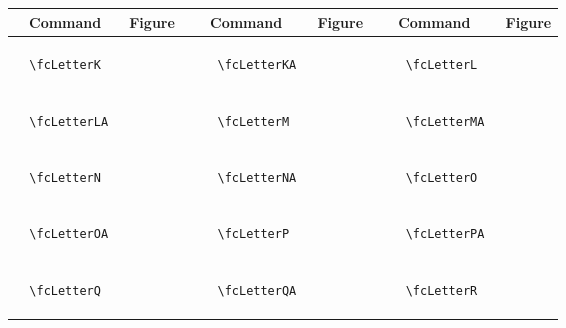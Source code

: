 \documentclass[x11names]{article}
\begin{document}
\begin{table}[H]\centering\begin{tabular}{|c|c|c|c|c|c|}\hline{\bf Command} & {\bf Figure} & {\bf Command} & {\bf Figure} & {\bf Command} & {\bf Figure}\\	\hline	&\multirow{5}{*}{	\fcLetterK	[scale=0.4]} & &\multirow{5}{*}{	\fcLetterKA	[scale=0.4]} & &\multirow{5}{*}{	\fcLetterL	[scale=0.4]}\\	& & & & & \\	& & & & & \\	\verb|	\fcLetterK	| & & \verb|	\fcLetterKA	| & & \verb|	\fcLetterL	| & \\	& & & & & \\	& & & & & \\	& & & & & \\	\hline									
		&\multirow{5}{*}{	\fcLetterLA	[scale=0.4]} & &\multirow{5}{*}{	\fcLetterM	[scale=0.4]} & &\multirow{5}{*}{	\fcLetterMA	[scale=0.4]}\\	& & & & & \\	& & & & & \\	\verb|	\fcLetterLA	| & & \verb|	\fcLetterM	| & & \verb|	\fcLetterMA	| & \\	& & & & & \\	& & & & & \\	& & & & & \\	\hline									
		&\multirow{5}{*}{	\fcLetterN	[scale=0.4]} & &\multirow{5}{*}{	\fcLetterNA	[scale=0.4]} & &\multirow{5}{*}{	\fcLetterO	[scale=0.4]}\\	& & & & & \\	& & & & & \\	\verb|	\fcLetterN	| & & \verb|	\fcLetterNA	| & & \verb|	\fcLetterO	| & \\	& & & & & \\	& & & & & \\	& & & & & \\	\hline									
		&\multirow{5}{*}{	\fcLetterOA	[scale=0.4]} & &\multirow{5}{*}{	\fcLetterP	[scale=0.4]} & &\multirow{5}{*}{	\fcLetterPA	[scale=0.4]}\\	& & & & & \\	& & & & & \\	\verb|	\fcLetterOA	| & & \verb|	\fcLetterP	| & & \verb|	\fcLetterPA	| & \\	& & & & & \\	& & & & & \\	& & & & & \\	\hline									
		&\multirow{5}{*}{	\fcLetterQ	[scale=0.4]} & &\multirow{5}{*}{	\fcLetterQA	[scale=0.4]} & &\multirow{5}{*}{	\fcLetterR	[scale=0.4]}\\	& & & & & \\	& & & & & \\	\verb|	\fcLetterQ	| & & \verb|	\fcLetterQA	| & & \verb|	\fcLetterR	| & \\	& & & & & \\	& & & & & \\	& & & & & \\	\hline									

\end{tabular}
\end{table}
\end{document}
